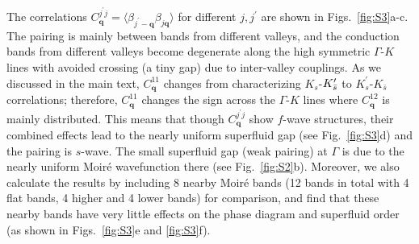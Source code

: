 \documentclass[twocolumn,english,prl,floatfix,citeautoscript,nofootinbib]{revtex4}
\begin{document}
\begin{widetext}
The correlations $C_{\mathbf{q}}^{j^{\prime }j}=\langle \beta _{j^{\prime }-%
\mathbf{q}}\beta _{j\mathbf{q}}\rangle $ for different $j,j^{\prime }$ are
shown in Figs.~\ref{fig:S3}a-c. The pairing is mainly between bands from
different valleys, and the conduction bands from different valleys become
degenerate along the high symmetric $\Gamma $-$K$ lines with avoided
crossing (a tiny gap) due to inter-valley couplings. As we discussed in the
main text, $C_{\mathbf{q}}^{11}$ changes from characterizing $K_{s}$-$K_{%
\bar{s}}^{\prime }$ to $K_{s}^{\prime }$-$K_{\bar{s}}$ correlations;
therefore, $C_{\mathbf{q}}^{11}$ changes the sign across the $\Gamma $-$K$
lines where $C_{\mathbf{q}}^{12}$ is mainly distributed.
This means that though $C_{\mathbf{q}}^{j^{\prime }j}$ show $f$-wave
structures, their combined effects lead to the nearly uniform superfluid gap
(see Fig.~\ref{fig:S3}d) and the pairing is $s$-wave. The small superfluid
gap (weak pairing) at $\Gamma$ is due to the nearly uniform Moir\'{e}
wavefunction there (see Fig.~\ref{fig:S2}b). Moreover, we also calculate the
results by including 8 nearby Moir\'{e} bands (12 bands in total with 4 flat
bands, 4 higher and 4 lower bands) for comparison, and find that these
nearby bands have very little effects on the phase diagram and superfluid
order (as shown in Figs.~\ref{fig:S3}e and \ref{fig:S3}f).


\end{widetext}
\end{document}

